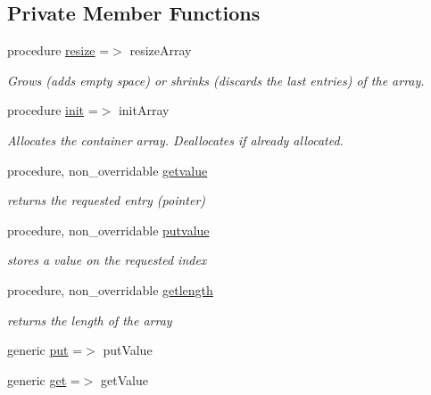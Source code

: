 \subsection*{Private Member Functions}
\begin{DoxyCompactItemize}
\item 
procedure \hyperlink{structabstract__container__array__mod_1_1container__array_ac75fccc4c778eb745479dc50f46bf1fe}{resize} =$>$ resize\+Array
\begin{DoxyCompactList}\small\item\em Grows (adds empty space) or shrinks (discards the last entries) of the array. \end{DoxyCompactList}\item 
procedure \hyperlink{structabstract__container__array__mod_1_1container__array_acae485dab14440247585b9dd68d1211e}{init} =$>$ init\+Array
\begin{DoxyCompactList}\small\item\em Allocates the container array. Deallocates if already allocated. \end{DoxyCompactList}\item 
procedure, non\+\_\+overridable \hyperlink{structabstract__container__array__mod_1_1container__array_ad7ed6004aa303b5ff71404ac843fb007}{getvalue}
\begin{DoxyCompactList}\small\item\em returns the requested entry (pointer) \end{DoxyCompactList}\item 
procedure, non\+\_\+overridable \hyperlink{structabstract__container__array__mod_1_1container__array_a1c164143f59afb9b88591592b4e1730c}{putvalue}
\begin{DoxyCompactList}\small\item\em stores a value on the requested index \end{DoxyCompactList}\item 
procedure, non\+\_\+overridable \hyperlink{structabstract__container__array__mod_1_1container__array_ab91570b2196a2f5aafb0aa51a114b451}{getlength}
\begin{DoxyCompactList}\small\item\em returns the length of the array \end{DoxyCompactList}\item 
generic \hyperlink{structabstract__container__array__mod_1_1container__array_a91473b9204b6235110b4c9469e152de7}{put} =$>$ put\+Value
\item 
generic \hyperlink{structabstract__container__array__mod_1_1container__array_a3dfae16ca3f2afa43766e4241f73dd1b}{get} =$>$ get\+Value
\end{DoxyCompactItemize}
